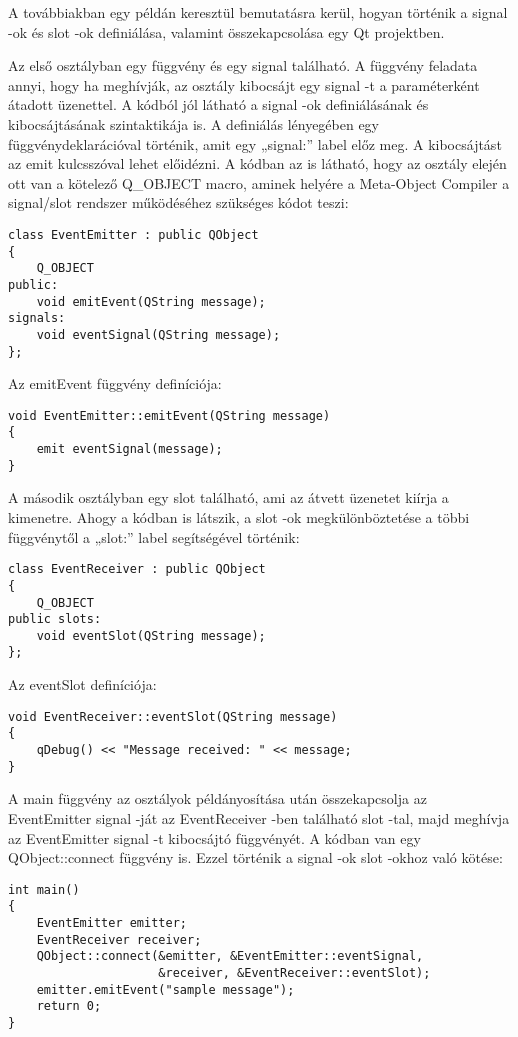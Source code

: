 A továbbiakban egy példán keresztül bemutatásra kerül, 
hogyan történik a signal -ok és slot -ok definiálása, 
valamint összekapcsolása egy Qt projektben.

Az első osztályban egy függvény és egy signal található. 
A függvény feladata annyi, hogy ha meghívják, 
az osztály kibocsájt egy signal -t a paraméterként átadott üzenettel. 
A kódból jól látható a signal -ok definiálásának 
és kibocsájtásának szintaktikája is. 
A definiálás lényegében egy függvénydeklarációval történik, 
amit egy {\ttfamily „signal:”} label előz meg. 
A kibocsájtást az {\ttfamily emit} kulcsszóval lehet előidézni. 
A kódban az is látható, 
hogy az osztály elején ott van a kötelező {\ttfamily Q\_OBJECT} macro, 
aminek helyére a Meta-Object Compiler a signal/slot rendszer 
működéséhez szükséges kódot teszi:
\begin{lstlisting}[style=customcpp]
class EventEmitter : public QObject
{
    Q_OBJECT
public:
    void emitEvent(QString message);
signals:
    void eventSignal(QString message);
};
\end{lstlisting}
Az {\ttfamily emitEvent} függvény definíciója:
\begin{lstlisting}[style=customcpp]
void EventEmitter::emitEvent(QString message)
{
    emit eventSignal(message);
}
\end{lstlisting}
\begin{sloppypar}
\setlength{\parindent}{0ex}
A második osztályban egy slot található, 
ami az átvett üzenetet kiírja a kimenetre. 
Ahogy a kódban is látszik, a slot -ok megkülönböztetése 
a többi függvénytől a {\ttfamily „slot:”} label segítségével történik:
\end{sloppypar}
\begin{lstlisting}[style=customcpp]
class EventReceiver : public QObject
{
    Q_OBJECT
public slots:
    void eventSlot(QString message);
};
\end{lstlisting}
Az eventSlot definíciója:
\begin{lstlisting}[style=customcpp]
void EventReceiver::eventSlot(QString message)
{
    qDebug() << "Message received: " << message;
}
\end{lstlisting}
\begin{sloppypar}
A main függvény az osztályok példányosítása után 
összekapcsolja az {\ttfamily EventEmitter} signal -ját 
az {\ttfamily EventReceiver} -ben található slot -tal, 
majd meghívja az {\ttfamily EventEmitter} signal -t kibocsájtó függvényét. 
A kódban van egy {\ttfamily QObject::connect} függvény is. 
Ezzel történik a signal -ok slot -okhoz való kötése:
\end{sloppypar}
\begin{lstlisting}[style=customcpp]
int main()
{
    EventEmitter emitter;
    EventReceiver receiver;
    QObject::connect(&emitter, &EventEmitter::eventSignal, 
                     &receiver, &EventReceiver::eventSlot);
    emitter.emitEvent("sample message");
    return 0;
}
\end{lstlisting}

